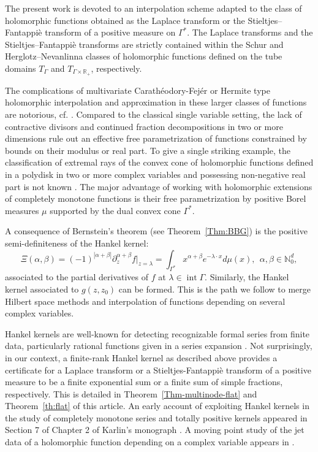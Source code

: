 \documentclass[11pt,reqno]{amsart}
\theoremstyle{plain}
\theoremstyle{definition}
\numberwithin{equation}{section}
\begin{document}
The present work is devoted to an interpolation scheme adapted to the class of holomorphic functions obtained as the Laplace transform or the Stieltjes–Fantappi\`e transform of a positive measure on $\Gamma^*$.
The Laplace transforms and the Stieltjes–Fantappi\`e transforms are strictly contained within the Schur and Herglotz–Nevanlinna classes of holomorphic functions defined on the tube domains $T_\Gamma$ and $T_{\Gamma \times \mathbb{R}_+}$, respectively. 


The complications of multivariate Carath\'eodory-Fej\'er or Hermite type holomorphic interpolation and approximation in these larger classes of functions are notorious, cf. \cite{BP2, Guillaume-Huard}. Compared to the classical single variable setting, 
	the lack of contractive divisors and continued fraction decompositions in two or more dimensions rule out an effective free parametrization of functions constrained by bounds on their
modulus or real part. To give a single striking example, the classification of extremal rays of the convex cone of holomorphic functions defined in a polydisk in two or more complex variables and possessing non-negative real part is not known \cite{Knese}.
The major advantage of working with holomorphic extensions of completely monotone functions is their free parametrization by positive Borel measures $\mu$ supported by the dual convex cone $\Gamma^\ast$. 

A consequence of Bernstein's theorem (see Theorem~\ref{Thm:BBG}) is the positive semi-definiteness of the Hankel kernel:
$$  \Xi (\alpha, \beta) = (-1)^{|\alpha + \beta|} \partial_z^{\alpha + \beta} f|_{z=\lambda} = \int_{\Gamma^\ast} x^{\alpha+\beta} e^{- \lambda \cdot x} d\mu(x), \ \ \alpha, \beta \in \mathbb{N}_0^d,$$
associated to the partial derivatives of $f$ at $\lambda \in \operatorname{int} \Gamma$. Similarly, the Hankel kernel associated to $g(z, z_0)$ can be formed.
This is the path we follow to merge Hilbert space methods and interpolation of functions depending on several complex variables.

Hankel kernels are well-known for detecting recognizable formal series from finite data, particularly rational functions given in a series expansion \cite{Fliess}. Not surprisingly, in our context, a finite-rank Hankel kernel as described above provides a certificate for a Laplace transform or a Stieltjes-Fantappi\`e transform of a positive measure to be a finite exponential sum or a finite sum of simple fractions, respectively. This is detailed in Theorem~\ref{Thm-multinode-flat} and Theorem~\ref{th:flat} of this article.
 An early account of exploiting Hankel kernels in the study of completely monotone series and totally positive kernels appeared in Section 7 of Chapter 2 of Karlin's monograph \cite{Karlin}. A moving point study of the jet data of a holomorphic function depending on a complex variable appears in \cite{Lubinsky}.
\end{document}
